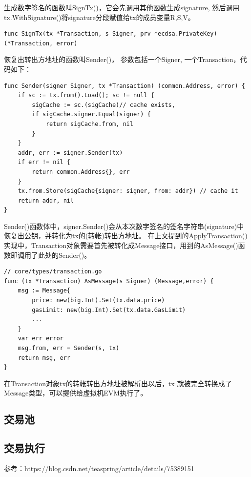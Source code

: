 \documentclass[UTF8]{ctexart}
\begin{document}
生成数字签名的函数叫SignTx()，它会先调用其他函数生成signature, 然后调用tx.WithSignature()将signature分段赋值给tx的成员变量R,S,V。

\begin{lstlisting}
func SignTx(tx *Transaction, s Signer, prv *ecdsa.PrivateKey) (*Transaction, error)
\end{lstlisting}

恢复出转出方地址的函数叫Sender()， 参数包括一个Signer, 一个Transaction，代码如下：

\begin{lstlisting}
func Sender(signer Signer, tx *Transaction) (common.Address, error) {  
    if sc := tx.from().Load(); sc != null {  
        sigCache := sc.(sigCache)// cache exists,  
        if sigCache.signer.Equal(signer) {  
            return sigCache.from, nil  
        }   
    }  
    addr, err := signer.Sender(tx)  
    if err != nil {  
        return common.Address{}, err  
    }  
    tx.from.Store(sigCache{signer: signer, from: addr}) // cache it  
    return addr, nil  
}  
\end{lstlisting}

Sender()函数体中，signer.Sender()会从本次数字签名的签名字符串(signature)中恢复出公钥，并转化为tx的(转帐)转出方地址。
在上文提到的ApplyTransaction()实现中，Transaction对象需要首先被转化成Message接口，用到的AsMessage()函数即调用了此处的Sender()。


\begin{lstlisting}
// core/types/transaction.go  
func (tx *Transaction) AsMessage(s Signer) (Message,error) {  
    msg := Message{  
        price: new(big.Int).Set(tx.data.price)  
        gasLimit: new(big.Int).Set(tx.data.GasLimit)  
        ...  
    }  
    var err error  
    msg.from, err = Sender(s, tx)  
    return msg, err  
}
\end{lstlisting}

在Transaction对象tx的转帐转出方地址被解析出以后，tx 就被完全转换成了Message类型，可以提供给虚拟机EVM执行了。

\subsection{交易池}


\subsection{交易执行}

参考：https://blog.csdn.net/teaspring/article/details/75389151
\end{document}
